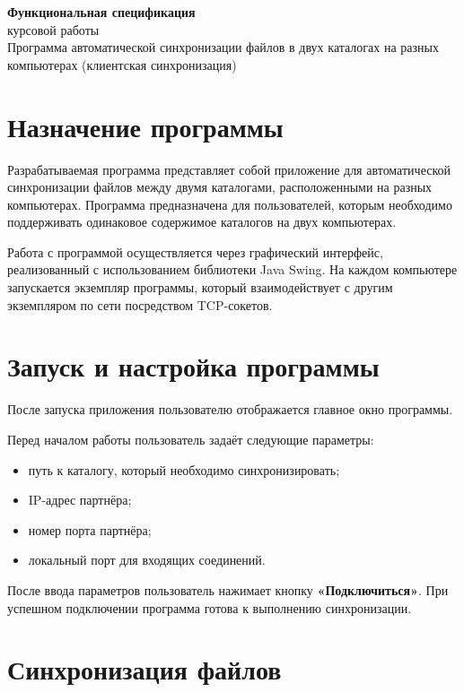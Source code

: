 \documentclass[12pt,a4paper]{article}
\begin{document}
\begin{center}
{\Large \textbf{Функциональная спецификация}}\\[0.4cm]
{\large курсовой работы}\\[0.6cm]
{\large Программа автоматической синхронизации файлов в двух каталогах на разных компьютерах (клиентская синхронизация)}
\end{center}

\vspace{0.5cm}

\section{Назначение программы}

Разрабатываемая программа представляет собой приложение для автоматической синхронизации файлов между двумя каталогами, расположенными на разных компьютерах. Программа предназначена для пользователей, которым необходимо поддерживать одинаковое содержимое каталогов на двух компьютерах.

Работа с программой осуществляется через графический интерфейс, реализованный с использованием библиотеки Java Swing. На каждом компьютере запускается экземпляр программы, который взаимодействует с другим экземпляром по сети посредством TCP-сокетов.

\section{Запуск и настройка программы}

После запуска приложения пользователю отображается главное окно программы.

Перед началом работы пользователь задаёт следующие параметры:

\begin{itemize}[nosep]
    \item путь к каталогу, который необходимо синхронизировать;
    \item IP-адрес партнёра;
    \item номер порта партнёра;
    \item локальный порт для входящих соединений.
\end{itemize}

После ввода параметров пользователь нажимает кнопку \textbf{«Подключиться»}. При успешном подключении программа готова к выполнению синхронизации.

\section{Синхронизация файлов}
\end{document}

